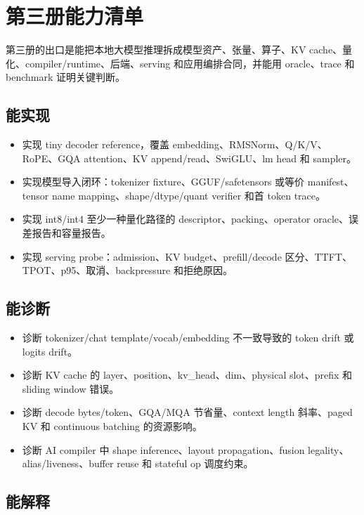 \chapter*{第三册能力清单}

第三册的出口是能把本地大模型推理拆成模型资产、张量、算子、KV cache、量化、compiler/runtime、后端、serving 和应用编排合同，并能用 oracle、trace 和 benchmark 证明关键判断。

\section*{能实现}

\begin{itemize}
  \item 实现 tiny decoder reference，覆盖 embedding、RMSNorm、Q/K/V、RoPE、GQA attention、KV append/read、SwiGLU、lm head 和 sampler。
  \item 实现模型导入闭环：tokenizer fixture、GGUF/safetensors 或等价 manifest、tensor name mapping、shape/dtype/quant verifier 和首 token trace。
  \item 实现 int8/int4 至少一种量化路径的 descriptor、packing、operator oracle、误差报告和容量报告。
  \item 实现 serving probe：admission、KV budget、prefill/decode 区分、TTFT、TPOT、p95、取消、backpressure 和拒绝原因。
\end{itemize}

\section*{能诊断}

\begin{itemize}
  \item 诊断 tokenizer/chat template/vocab/embedding 不一致导致的 token drift 或 logits drift。
  \item 诊断 KV cache 的 layer、position、kv\_head、dim、physical slot、prefix 和 sliding window 错误。
  \item 诊断 decode bytes/token、GQA/MQA 节省量、context length 斜率、paged KV 和 continuous batching 的资源影响。
  \item 诊断 AI compiler 中 shape inference、layout propagation、fusion legality、alias/liveness、buffer reuse 和 stateful op 调度约束。
\end{itemize}

\section*{能解释}

